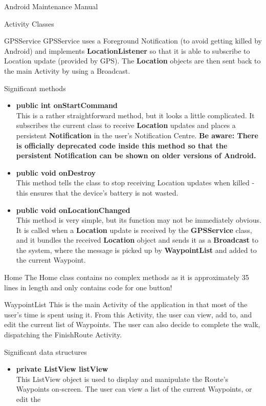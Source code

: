\documentclass{article}
\begin{document}
\begin{section}{Android Maintenance Manual}
\begin{subsection}{Activity Classes}
		\begin{subsubsection}{GPSService}
			GPSService uses a Foreground Notification (to avoid getting killed by Android) and implements {\bf LocationListener} so that it is able to subscribe to Location update (provided by GPS). The {\bf Location} objects are then sent back to the main Activity by using a Broadcast.
			\begin{paragraph}{Significant methods}
				\begin{itemize}
					\item{{\bf public int onStartCommand} \\
					This is a rather straightforward method, but it looks a little complicated. It subscribes the current class to receive {\bf Location} updates and places a persistent {\bf Notification} in the user's Notification Centre. {\bf Be aware: There is officially deprecated code inside this method so that the persistent Notification can be shown on older versions of Android.}}
					\item{{\bf public void onDestroy} \\
					This method tells the class to stop receiving Location updates when killed - this ensures that the device's battery is not wasted.}
					\item{{\bf public void onLocationChanged} \\
					This method is very simple, but its function may not be immediately obvious. It is called when a {\bf Location} update is received by the {\bf GPSService} class, and it bundles the received {\bf Location} object and sends it as a {\bf Broadcast} to the system, where the message is picked up by {\bf WaypointList} and added to the current Waypoint.}
				\end{itemize}			
			\end{paragraph}
		\end{subsubsection}
		
		\begin{subsubsection}{Home}
			The Home class contains no complex methods as it is approximately 35 lines in length and only contains code for one button!
		\end{subsubsection}
		
		\newpage
		\begin{subsubsection}{WaypointList}
			This is the main Activity of the application in that most of the user's time is spent using it. From this Activity, the user can view, add to, and edit the current list of Waypoints. The user can also decide to complete the walk, dispatching the FinishRoute Activity.
			\begin{paragraph}{Significant data structures}
				\begin{itemize}
					\item{{\bf private ListView listView} \\
					This ListView object is used to display and manipulate the Route's Waypoints on-screen. The user can view a list of the current Waypoints, or edit the}
				\end{itemize}
			\end{paragraph}
			

\end{subsubsection}
\end{subsection}
\end{section}
\end{document}
